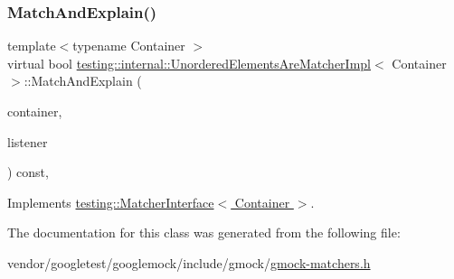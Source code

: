 \mbox{\label{classtesting_1_1internal_1_1_unordered_elements_are_matcher_impl_a4031291eef9be8c1e9e1effdd02c4334}} 
\subsubsection{\texorpdfstring{Match\+And\+Explain()}{MatchAndExplain()}}
{\footnotesize\ttfamily template$<$typename Container $>$ \\
virtual bool \hyperlink{classtesting_1_1internal_1_1_unordered_elements_are_matcher_impl}{testing\+::internal\+::\+Unordered\+Elements\+Are\+Matcher\+Impl}$<$ Container $>$\+::Match\+And\+Explain (\begin{DoxyParamCaption}\item[{Container}]{container,  }\item[{\hyperlink{classtesting_1_1_match_result_listener}{Match\+Result\+Listener} $\ast$}]{listener }\end{DoxyParamCaption}) const\hspace{0.3cm}{\ttfamily [inline]}, {\ttfamily [virtual]}}



Implements \hyperlink{classtesting_1_1_matcher_interface_a296b43607cd99d60365f0e6a762777cf}{testing\+::\+Matcher\+Interface$<$ Container $>$}.



The documentation for this class was generated from the following file\+:\begin{DoxyCompactItemize}
\item 
vendor/googletest/googlemock/include/gmock/\hyperlink{gmock-matchers_8h}{gmock-\/matchers.\+h}\end{DoxyCompactItemize}

